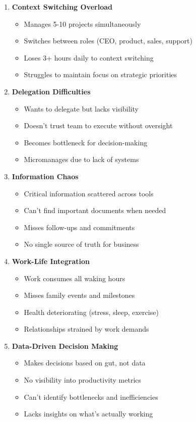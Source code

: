 \begin{enumerate}
    \item \textbf{Context Switching Overload}
    \begin{itemize}
        \item Manages 5-10 projects simultaneously
        \item Switches between roles (CEO, product, sales, support)
        \item Loses 3+ hours daily to context switching
        \item Struggles to maintain focus on strategic priorities
    \end{itemize}
    
    \item \textbf{Delegation Difficulties}
    \begin{itemize}
        \item Wants to delegate but lacks visibility
        \item Doesn't trust team to execute without oversight
        \item Becomes bottleneck for decision-making
        \item Micromanages due to lack of systems
    \end{itemize}
    
    \item \textbf{Information Chaos}
    \begin{itemize}
        \item Critical information scattered across tools
        \item Can't find important documents when needed
        \item Misses follow-ups and commitments
        \item No single source of truth for business
    \end{itemize}
    
    \item \textbf{Work-Life Integration}
    \begin{itemize}
        \item Work consumes all waking hours
        \item Misses family events and milestones
        \item Health deteriorating (stress, sleep, exercise)
        \item Relationships strained by work demands
    \end{itemize}
    
    \item \textbf{Data-Driven Decision Making}
    \begin{itemize}
        \item Makes decisions based on gut, not data
        \item No visibility into productivity metrics
        \item Can't identify bottlenecks and inefficiencies
        \item Lacks insights on what's actually working
    \end{itemize}
\end{enumerate}

